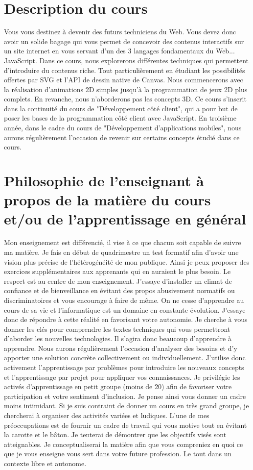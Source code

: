 \section{Description du cours}
Vous vous destinez à devenir des futurs techniciens du Web. Vous devez donc avoir un solide bagage qui vous permet de concevoir des contenus interactifs sur un site internet en vous servant d’un des 3 langages fondamentaux du Web... JavaScript. Dans ce cours, nous explorerons différentes techniques qui permettent d’introduire du contenus riche. Tout particulièrement en étudiant les possibilités offertes par SVG et l’API de dessin native de Canvas. Nous commencerons avec la réalisation d’animations 2D simples jusqu’à la programmation de jeux 2D plus complets. En revanche, nous n’aborderons pas les concepts 3D.
Ce cours s’inscrit dans la continuité du cours de "Développement côté client", qui a pour but de poser les bases de la programmation côté client avec JavaScript. En troisième année, dans le cadre du cours de "Développement d'applications mobiles", nous aurons régulièrement l’occasion de revenir sur certains concepts étudié dans ce cours.
\clearpage
\section{Philosophie de l’enseignant à propos de la matière du cours et/ou de l’apprentissage en général}
Mon enseignement est différencié, il vise à ce que chacun soit capable de suivre ma matière. Je fais en début de quadrimestre un test formatif afin d’avoir une vision plus précise de l’hétérogénéité de mon publique. Ainsi je peux proposer des exercices supplémentaires aux apprenants qui en auraient le plus besoin.
Le respect est au centre de mon enseignement. J’essaye d’installer un climat de confiance et de bienveillance en évitant des propos abusivement normatifs ou discriminatoires et vous encourage à faire de même.
On ne cesse d’apprendre au cours de sa vie et l’informatique est un domaine en constante évolution. J’essaye donc de répondre à cette réalité en favorisant votre autonomie. Je cherche à vous donner les clés pour comprendre les textes techniques qui vous permettront d’aborder les nouvelles technologies. Il s’agira donc beaucoup d’apprendre à apprendre. Nous aurons régulièrement l’occasion d’analyser des besoins et d’y apporter une solution concrète collectivement ou individuellement. J’utilise donc activement l’apprentissage par problèmes pour introduire les nouveaux concepts et l’apprentissage par projet pour appliquer vos connaissances. Je privilégie les activés d’apprentissage en petit groupe (moins de 20) afin de favoriser votre participation et votre sentiment d’inclusion. Je pense ainsi vous donner un cadre moins intimidant. Si je suis contraint de donner un cours en très grand groupe, je chercherai à organiser des activités variées et ludiques.
L’une de mes préoccupations est de fournir un cadre de travail qui vous motive tout en évitant la carotte et le bâton. Je tenterai de démontrer que les objectifs visés sont atteignables. Je conceptualiserai la matière afin que vous compreniez en quoi ce que je vous enseigne vous sert dans votre future profession. Le tout dans un contexte libre et autonome.

